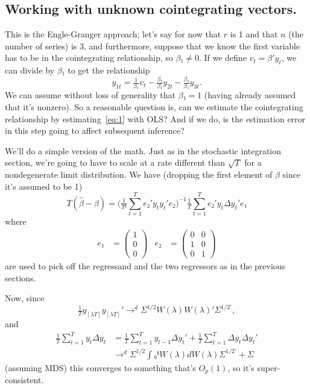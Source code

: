 \subsection{Working with unknown cointegrating vectors.}

This is the Engle-Granger approach; let's say for now that $r$ is 1
and that $n$ (the number of series) is 3, and furthermore, suppose
that we know the first variable has to be in the cointegrating
relationship, so $β₁ ≠ 0$.  If we define $v_t = β'y_t$, we can divide
by $β₁$ to get the relationship
\begin{equation}\label{eq:1}
  y_{1t} = \tfrac{1}{β₁} v_t - \tfrac{β₂}{β₁} y_{2t} - \tfrac{β₃}{β₁} y_{3t}.
\end{equation}
We can assume without loss of generality that $β₁=1$ (having already
assumed that it's nonzero).  So a reasonable question is, can we
estimate the cointegrating relationship by estimating~\eqref{eq:1}
with OLS?  And if we do, is the estimation error in this step going to
affect subsequent inference?

We'll do a simple version of the math.  Just as in the stochastic
integration section, we're going to have to scale at a rate different
than $\sqrt{T}$ for a nondegenerate limit distribution.  We have
(dropping the first element of $β$ since it's assumed to be 1)
\begin{equation*}
  T(\hat β - β)
  = \Big( \tfrac{1}{T²} ∑_{t=1}^T e₂'y_t y_t'e₂ \Big)^{-1}
    \tfrac{1}{T} ∑_{t=1}^T e₂'y_t Δy_t'e₁
\end{equation*}
where
\begin{align*}
  e₁ &= \begin{pmatrix} 1 \\ 0 \\ 0 \end{pmatrix} &
  e₂ &= \begin{pmatrix} 0 & 0 \\ 1 & 0 \\ 0 & 1 \end{pmatrix}
\end{align*}
are used to pick off the regressand and the two regressors as in the
previous sections.

Now, since
\[\tfrac{1}{T} y_{[λT]} y_{[λT]}' →^d Σ^{1/2} W(λ)W(λ)' Σ^{1/2\prime},\]
and
\begin{align*}
  \tfrac{1}{T} ∑_{t=1}^T y_t Δy_t
  &= \tfrac{1}{T} ∑_{t=1}^T y_{t-1} Δy_t' + \tfrac{1}{T} ∑_{t=1}^T Δy_t Δy_t' \\
  &→^d Σ^{1/2} ∫₀¹ W(λ) dW(λ) Σ^{1/2\prime} + Σ
\end{align*}
(assuming MDS) this converges to something that's $O_p(1)$, so it's
super-consistent.

